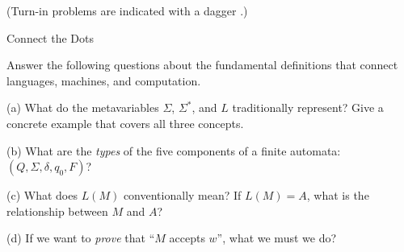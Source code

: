 \documentclass[11pt]{book}
\begin{document}
\begin{center}
  (Turn-in problems are indicated with a dagger \turninproblem{}.)
\end{center}


\begin{problem}{Connect the Dots}

Answer the following questions about the fundamental definitions that connect languages, machines, and computation.

\vspace{1em}

\noindent (a) What do the metavariables \( Σ \), \( Σ^* \), and \( L \) traditionally represent?
  Give a concrete example that covers all three concepts.

\vspace{1in}

\noindent (b) What are the \emph{types} of the five components of a finite automata: \( (Q, \Sigma, \delta, q_0, F) \)?

\vspace{1in}

\noindent (c) What does \( L(M) \) conventionally mean?
  If \( L(M) = A \), what is the relationship between \( M \) and \( A \)?

\vspace{1in}

\noindent (d) If we want to \emph{prove} that ``\( M \) accepts \( w \)'', what we must we do?

\vspace{1in}

\end{problem}

\newpage

\end{document}
